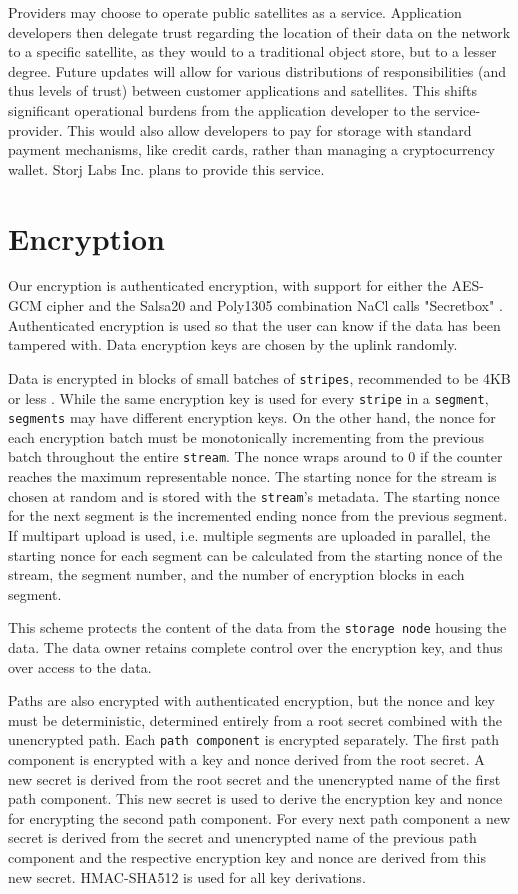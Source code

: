 \documentclass[11pt,fleqn,openany]{book}
\newcommand{\x}[1]{{\tt #1}} \newcommand{\code}[1]{{\em #1}}
\begin{document}
Providers may choose to operate public satellites as a service.
Application developers then delegate trust regarding the location of their
data on the network to a specific satellite, as they
would to a traditional object store, but to a lesser degree. Future updates
will allow for various distributions of responsibilities (and thus levels of
trust) between customer applications and satellites. This shifts significant
operational burdens from the application developer to the service-provider.
This would also allow developers to pay for storage with standard payment
mechanisms, like credit cards, rather than managing a cryptocurrency wallet.
Storj Labs Inc. plans to provide this service.

\section{Encryption}

Our encryption is authenticated encryption, with support for either the
AES-GCM cipher and the Salsa20 and Poly1305 combination NaCl calls "Secretbox"
\cite{nacl-crypto}. Authenticated encryption is used so that the user can know
if the data has been tampered with. Data encryption keys are chosen by the
uplink randomly.

Data is encrypted in blocks of small batches of \x{stripes}, recommended to be
4KB or less \cite{nacl-packetlen}. While the same encryption key is used for
every \x{stripe} in a \x{segment}, \x{segments} may have
different encryption keys. On the other hand, the nonce for each encryption
batch must be monotonically incrementing from the previous batch throughout the
entire \x{stream}. The nonce wraps around to 0 if the counter reaches the
maximum representable nonce. The starting nonce for the stream is chosen at
random and is stored with the \x{stream}'s metadata.
The starting nonce for the next segment
is the incremented ending nonce from the previous segment. If multipart upload
is used, i.e. multiple segments are uploaded in parallel, the starting nonce
for each segment can be calculated from the starting nonce of the stream, the
segment number, and the number of encryption blocks in each segment.

This scheme protects the
content of the data from the \x{storage node} housing the data. The data owner
retains complete control over the encryption key, and thus over access to the
data.

Paths are also encrypted with authenticated encryption, but the nonce and key
must be deterministic, determined entirely from a root secret combined with the
unencrypted path. Each \x{path component} is encrypted separately.
The first path component is encrypted with a key and nonce derived from the
root secret. A new secret is derived from the root secret and the unencrypted
name of the first path component. This new secret is used to derive the
encryption key and nonce for encrypting the second path component. For every
next path component a new secret is derived from the secret and unencrypted
name of the previous path component and the respective encryption key and
nonce are derived from this new secret. HMAC-SHA512 is used for all key
derivations.
\end{document}
